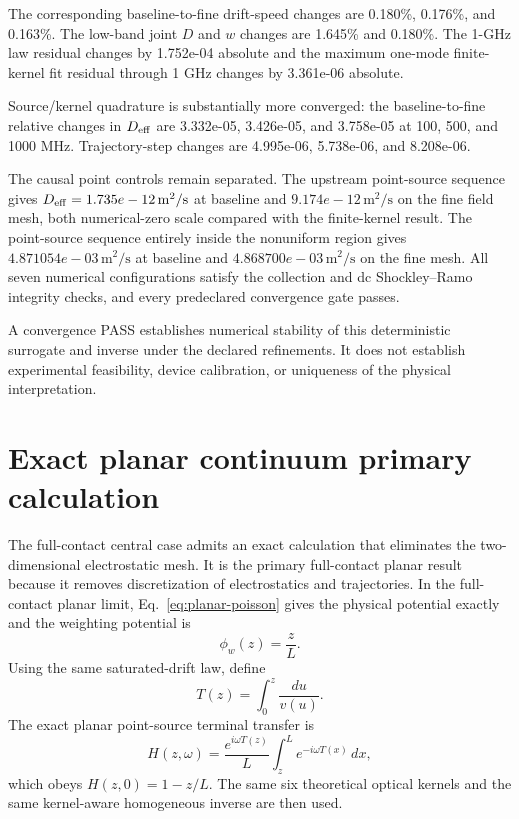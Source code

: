 \documentclass[aps,pra,onecolumn,superscriptaddress,nofootinbib]{revtex4-2}
\begin{document}
The corresponding baseline-to-fine drift-speed changes are 0.180\%, 0.176\%, and 0.163\%.  The low-band joint $D$ and $w$ changes are 1.645\% and 0.180\%.  The 1-GHz law residual changes by 1.752e-04 absolute and the maximum one-mode finite-kernel fit residual through 1 GHz changes by 3.361e-06 absolute.

Source/kernel quadrature is substantially more converged: the baseline-to-fine relative changes in $D_{\rm eff}$ are 3.332e-05, 3.426e-05, and 3.758e-05 at 100, 500, and 1000 MHz.  Trajectory-step changes are 4.995e-06, 5.738e-06, and 8.208e-06.

The causal point controls remain separated.  The upstream point-source sequence gives $D_{\rm eff}=1.735e-12\,\mathrm{m^2/s}$ at baseline and $9.174e-12\,\mathrm{m^2/s}$ on the fine field mesh, both numerical-zero scale compared with the finite-kernel result.  The point-source sequence entirely inside the nonuniform region gives $4.871054e-03\,\mathrm{m^2/s}$ at baseline and $4.868700e-03\,\mathrm{m^2/s}$ on the fine mesh.  All seven numerical configurations satisfy the collection and dc Shockley--Ramo integrity checks, and every predeclared convergence gate passes.

A convergence PASS establishes numerical stability of this deterministic surrogate and inverse under the declared refinements.  It does not establish experimental feasibility, device calibration, or uniqueness of the physical interpretation.

\section{Exact planar continuum primary calculation}

The full-contact central case admits an exact calculation that eliminates the two-dimensional electrostatic mesh. It is the primary full-contact planar result because it removes discretization of electrostatics and trajectories.  In the full-contact planar limit, Eq.~\eqref{eq:planar-poisson} gives the physical potential exactly and the weighting potential is
\begin{equation}
\phi_w(z)=\frac{z}{L}.
\end{equation}
Using the same saturated-drift law, define
\begin{equation}
T(z)=\int_0^z\frac{du}{v(u)}.
\end{equation}
The exact planar point-source terminal transfer is
\begin{equation}
H(z,\omega)=\frac{e^{i\omega T(z)}}{L}\int_z^L e^{-i\omega T(x)}\,dx,
\end{equation}
which obeys $H(z,0)=1-z/L$.  The same six theoretical optical kernels and the same kernel-aware homogeneous inverse are then used.
\end{document}
